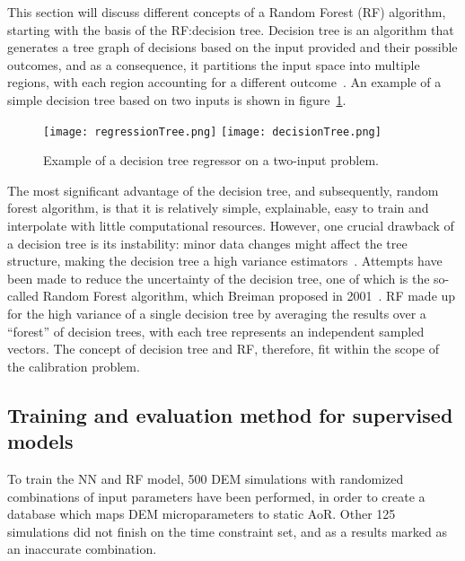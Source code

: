 
This section will discuss different concepts of a Random Forest (RF) algorithm, starting with the basis of the RF:\@ decision tree. Decision tree is an algorithm that generates a tree graph of decisions based on the input provided and their possible outcomes, and as a consequence, it partitions the input space into multiple regions, with each region accounting for a different outcome~\cite{murphyML}. An example of a simple decision tree based on two inputs is shown in figure~\ref{fig:decisionTree}. 

\begin{figure}[H]
    \centering
    \texttt{[image: regressionTree.png]}
    \texttt{[image: decisionTree.png]}
    \caption{Example of a decision tree regressor on a two-input problem.~\cite{murphyML}}\label{fig:decisionTree}
\end{figure}

The most significant advantage of the decision tree, and subsequently, random forest algorithm, is that it is relatively simple, explainable, easy to train and interpolate with little computational resources. However, one crucial drawback of a decision tree is its instability: minor data changes might affect the tree structure, making the decision tree a high variance estimators~\cite{murphyML}. Attempts have been made to reduce the uncertainty of the decision tree, one of which is the so-called Random Forest algorithm, which Breiman proposed in 2001~\cite{BreimanRF}. RF made up for the high variance of a single decision tree by averaging the results over a ``forest'' of decision trees, with each tree represents an independent sampled vectors. The concept of decision tree and RF, therefore, fit within the scope of the calibration problem.


\subsection{Training and evaluation method for supervised models}  

To train the NN and RF model, 500 DEM simulations with randomized combinations of input parameters have been performed, in order to create a database which maps DEM microparameters to static AoR. Other 125 simulations did not finish on the time constraint set, and as a results marked as an inaccurate combination. 


